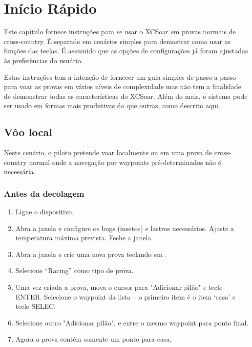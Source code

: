 \chapter{Início Rápido}\label{cha:quickstart}

Este capítulo fornece instruções para se usar o XCSoar em provas normais de cross-country.  É separado em cenários simples para demostrar como usar as funções das teclas.  É assumido que as opções de configurações já foram ajustadas às preferências do usuário.

Estas instruções tem a intenção de fornecer um guia simples de passo a passo para voar as provas em vários níveis de complexidade mas não tem a finalidade de demonstrar todas as características do XCSoar.  Além do mais, o sistema pode ser usado em formas mais produtivas do que outras, como descrito aqui.



\section{Vôo local}\label{sec:local-flight}

Neste cenário, o piloto pretende voar localmente ou em uma prova de cross-country normal onde a navegação por waypoints pré-determinados não é necessária.

\subsection*{Antes da decolagem}
\begin{enumerate}
\item  Ligue o dispositivo.
\item  Abra a janela  e configure os bugs (insetos) e lastros necessários.  Ajuste a temperatura máxima prevista.  Feche a janela.
\item  Abra a janela   e crie uma nova prova teclando em .
\item  Selecione  ``Racing'' como tipo de prova.
\item  Uma vez criada a prova, mova o cursor para "Adicionar pilão" e tecle ENTER.  Selecione o waypoint da lista – o primeiro item é o item ‘casa’ e tecle SELEC.  
\item Selecione outro "Adicionar pilão", e entre o mesmo waypoint para ponto final.
\item  Agora a prova contém somente um ponto para casa.
\end{enumerate}

